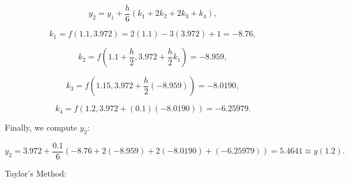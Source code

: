 \documentclass[12pt]{exam}
\begin{document}
\begin{questions}
\begin{parts}
\begin{solution}
    $$
    y_2 = y_1 + \frac{h}{6} \left( k_1 + 2k_2 + 2k_3 + k_4 \right),
    $$

    $$
    k_1 = f(1.1, 3.972) = 2(1.1) - 3(3.972) + 1 = -8.76,
    $$

    $$
    k_2 = f\left( 1.1 + \frac{h}{2}, 3.972 + \frac{h}{2} k_1 \right) = -8.959,
    $$

    $$
    k_3 = f\left( 1.15, 3.972 + \frac{h}{2} (-8.959) \right) = -8.0190,
    $$

    $$
    k_4 = f(1.2, 3.972 + (0.1)(-8.0190)) = -6.25979.
    $$

    Finally, we compute $y_2$:

    $$
    y_2 = 3.972 + \frac{0.1}{6} \left( -8.76 + 2(-8.959) + 2(-8.0190) + (-6.25979) \right) = 5.4641 \approx y(1.2).
    $$

\end{solution}


\end{parts}

\newpage

\question Taylor's Method:\\
\end{questions}
\end{document}
